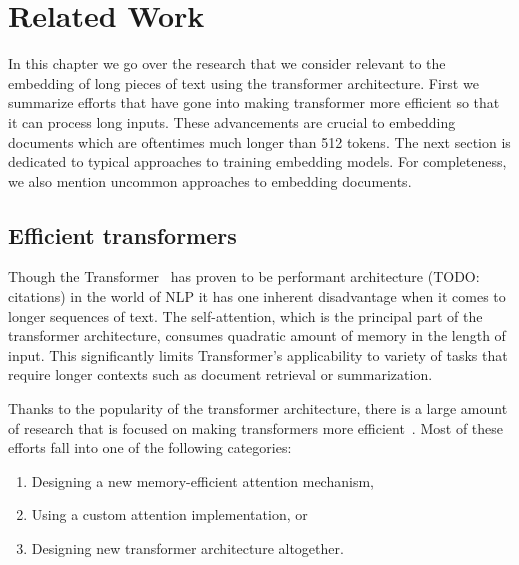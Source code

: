 \chapter{Related Work}


In this chapter we go over the research that we consider relevant to the
embedding of long pieces of text using the transformer architecture. First we
summarize efforts that have gone into making transformer more efficient so that
it can process long inputs. These advancements are crucial to embedding
documents which are oftentimes much longer than 512 tokens. The next section is
dedicated to typical approaches to training embedding models. For completeness,
we also mention uncommon approaches to embedding documents.

\section{Efficient transformers}


Though the Transformer~\citep{vaswani2017attention} has proven to be performant
architecture (TODO: citations) in the world of NLP it has one inherent
disadvantage when it comes to longer sequences of text. The self-attention,
which is the principal part of the transformer architecture, consumes quadratic
amount of memory in the length of input. This significantly limits Transformer's
applicability to variety of tasks that require longer contexts such as document
retrieval or summarization.

Thanks to the popularity of the transformer architecture, there is a large
amount of research that is focused on making transformers more
efficient~\citep{tay2022efficient}. Most of these efforts fall into one of the
following categories:

\begin{enumerate}

    \item Designing a new memory-efficient attention mechanism,

    \item Using a custom attention implementation, or

    \item Designing new transformer architecture altogether.

\end{enumerate}

